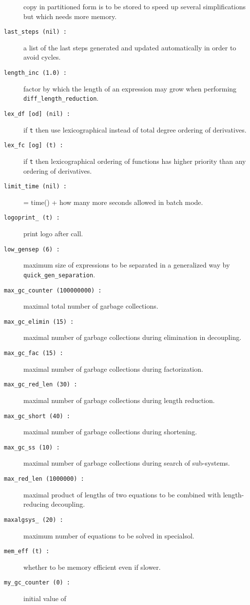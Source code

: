 \begin{description}
  copy in partitioned form is to be stored to speed up several
  simplifications but which needs more memory.
\item[\texttt{last\_steps (nil) :}] a list of the last steps generated
  and updated automatically in order to avoid cycles.
\item[\texttt{length\_inc (1.0) :}] factor by which the length of an
  expression may grow when performing \texttt{diff\_length\_reduction}.
\item[\texttt{lex\_df [od] (nil) :}] if \texttt{t} then use
  lexicographical instead of total degree ordering of derivatives.
\item[\texttt{lex\_fc [og] (t) :}] if \texttt{t} then lexicographical
  ordering of functions has higher priority than any ordering of
  derivatives.
\item[\texttt{limit\_time (nil) :}] = time() + how many more seconds
  allowed in batch mode.
\item[\texttt{logoprint\_ (t) :}] print logo after 
  call.
\item[\texttt{low\_gensep (6) :}] maximum size of expressions to be
  separated in a generalized way by \texttt{quick\_gen\_separation}.
\item[\texttt{max\_gc\_counter (100000000) :}] maximal total number of
  garbage collections.
\item[\texttt{max\_gc\_elimin (15) :}] maximal number of garbage
  collections during elimination in decoupling.
\item[\texttt{max\_gc\_fac (15) :}] maximal number of garbage
  collections during factorization.
\item[\texttt{max\_gc\_red\_len (30) :}] maximal number of garbage
  collections during length reduction.
\item[\texttt{max\_gc\_short (40) :}] maximal number of garbage
  collections during shortening.
\item[\texttt{max\_gc\_ss (10) :}] maximal number of garbage
  collections during search of sub-systems.
\item[\texttt{max\_red\_len (1000000) :}] maximal product of lengths
  of two equations to be combined with length-reducing decoupling.
\item[\texttt{maxalgsys\_ (20) :}] maximum number of equations to be
  solved in specialsol.
\item[\texttt{mem\_eff (t) :}] whether to be memory efficient even if
  slower.
\item[\texttt{my\_gc\_counter (0) :}] initial value of

\end{description}
